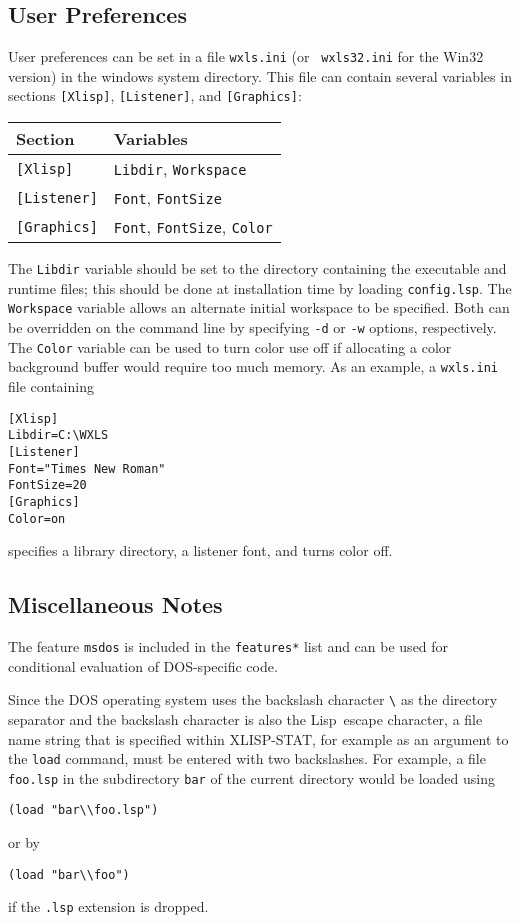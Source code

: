 \documentclass[11pt]{article}
\newcommand{\dcode}[1]{{\tt #1}}
\newcommand{\LS}{Lisp}
\newcommand{\XLS}{XLISP-STAT}
\newcommand{\WXLS}{WXLS}
\begin{document}
\subsection{User Preferences}
User preferences can be set in a file {\tt wxls.ini} (or {\tt
wxls32.ini} for the Win32 version) in the windows system directory.
This file can contain several variables in sections {\tt [Xlisp]},
{\tt [Listener]}, and {\tt [Graphics]}:
\begin{center}
  \begin{tabular}{ll}
    Section & Variables\\
    \hline
    {\tt [Xlisp]} & {\tt Libdir}, {\tt Workspace}\\
    {\tt [Listener]} & {\tt Font}, {\tt FontSize}\\
    {\tt [Graphics]} & {\tt Font}, {\tt FontSize}, {\tt Color}\\
    \hline
  \end{tabular}
\end{center}
The {\tt Libdir} variable should be set to the directory containing
the executable and runtime files; this should be done at installation
time by loading {\tt config.lsp}. The {\tt Workspace} variable allows
an alternate initial workspace to be specified. Both can be overridden
on the command line by specifying {\tt -d} or {\tt -w} options,
respectively. The {\tt Color} variable can be used to turn color use
off if allocating a color background buffer would require too much
memory. As an example, a {\tt wxls.ini} file containing
\begin{verbatim}
[Xlisp]
Libdir=C:\WXLS
[Listener]
Font="Times New Roman"
FontSize=20
[Graphics]
Color=on
\end{verbatim}
specifies a library directory, a listener font, and turns color off.

\subsection{Miscellaneous Notes}
The feature \dcode{msdos} is included in the \dcode{*features*} list
and can be used for conditional evaluation of DOS-specific code.

Since the DOS operating system uses the backslash character \verb+\+
as the directory separator and the backslash character is also the
\LS\ escape character, a file name string that is specified within
\XLS, for example as an argument to the \dcode{load} command, must be
entered with two backslashes. For example, a file \dcode{foo.lsp} in
the subdirectory \dcode{bar} of the current directory would be loaded
using
\begin{verbatim}
(load "bar\\foo.lsp")
\end{verbatim}
or by
\begin{verbatim}
(load "bar\\foo")
\end{verbatim}
if the \dcode{.lsp} extension is dropped.
\end{document}
